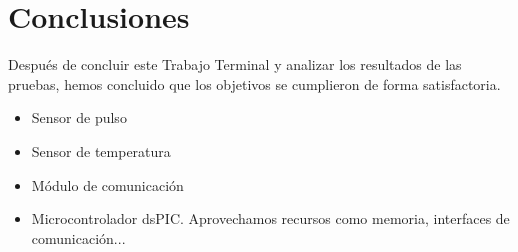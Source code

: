 
\section{Conclusiones}

Después de concluir este Trabajo Terminal y analizar los resultados de las pruebas, hemos concluido que los objetivos se cumplieron de forma satisfactoria.

\begin{itemize}
	\item Sensor de pulso
	\item Sensor de temperatura
	\item Módulo de comunicación 
	\item Microcontrolador dsPIC. Aprovechamos recursos como memoria, interfaces de comunicación...
	
\end{itemize}